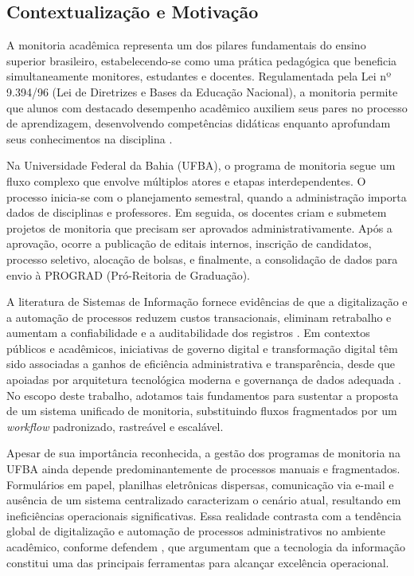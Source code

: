 \documentclass[portuguese]{sbc2025}%
\begin{document}
\subsection{Contextualização e Motivação}

A monitoria acadêmica representa um dos pilares fundamentais do ensino superior brasileiro, estabelecendo-se como uma prática pedagógica que beneficia simultaneamente monitores, estudantes e docentes. Regulamentada pela Lei nº 9.394/96 (Lei de Diretrizes e Bases da Educação Nacional), a monitoria permite que alunos com destacado desempenho acadêmico auxiliem seus pares no processo de aprendizagem, desenvolvendo competências didáticas enquanto aprofundam seus conhecimentos na disciplina \cite{Brasil1996}.

Na Universidade Federal da Bahia (UFBA), o programa de monitoria segue um fluxo complexo que envolve múltiplos atores e etapas interdependentes. O processo inicia-se com o planejamento semestral, quando a administração importa dados de disciplinas e professores. Em seguida, os docentes criam e submetem projetos de monitoria que precisam ser aprovados administrativamente. Após a aprovação, ocorre a publicação de editais internos, inscrição de candidatos, processo seletivo, alocação de bolsas, e finalmente, a consolidação de dados para envio à PROGRAD (Pró-Reitoria de Graduação).

A literatura de Sistemas de Informação fornece evidências de que a digitalização e a automação de processos reduzem custos transacionais, eliminam retrabalho e aumentam a confiabilidade e a auditabilidade dos registros \cite{Laudon_Laudon_2011, Davenport1993, Hammer1993}. Em contextos públicos e acadêmicos, iniciativas de governo digital e transformação digital têm sido associadas a ganhos de eficiência administrativa e transparência, desde que apoiadas por arquitetura tecnológica moderna e governança de dados adequada \cite{OECD2020, UNESCO2022}. No escopo deste trabalho, adotamos tais fundamentos para sustentar a proposta de um sistema unificado de monitoria, substituindo fluxos fragmentados por um \textit{workflow} padronizado, rastreável e escalável.

Apesar de sua importância reconhecida, a gestão dos programas de monitoria na UFBA ainda depende predominantemente de processos manuais e fragmentados. Formulários em papel, planilhas eletrônicas dispersas, comunicação via e-mail e ausência de um sistema centralizado caracterizam o cenário atual, resultando em ineficiências operacionais significativas. Essa realidade contrasta com a tendência global de digitalização e automação de processos administrativos no ambiente acadêmico, conforme defendem \cite{Laudon_Laudon_2011}, que argumentam que a tecnologia da informação constitui uma das principais ferramentas para alcançar excelência operacional.
\end{document}
